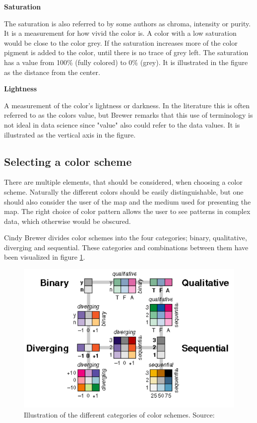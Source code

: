 \textbf{Saturation}

The saturation is also referred to by some authors as chroma, intensity or purity. It is a measurement for how vivid the color is. A color with a low saturation would be close to the color grey. If the saturation increases more of the color pigment is added to the color, until there is no trace of grey left. The saturation has a value from 100\% (fully colored) to 0\% (grey). It is illustrated in the figure as the distance from the center.

\textbf{Lightness}

A measurement of the color’s lightness or darkness. In the literature this is often referred to as the colors value, but Brewer remarks that this use of terminology is not ideal in data science since "value" also could refer to the data values. It is illustrated as the vertical axis in the figure.  \citep{Dent}

 
\subsection{Selecting a color scheme}
There are multiple elements, that should be considered, when choosing a color scheme.
Naturally the different colors should be easily distinguishable, but one should also consider the user of the map and the medium used for presenting the map. The right choice of color pattern allows the user to see patterns in complex data, which otherwise would be obscured. 


Cindy Brewer divides color schemes into the four categories; binary, qualitative, diverging and sequential. These categories and combinations between them have been visualized in figure \ref{BrewerDataTypes}. \citep{Brewer94}

\begin{figure} [H]
	\centering
	\includegraphics[width=.8\textwidth]{Pictures/BrewerDataTypes}
	\caption{Illustration of the different categories of color schemes. Source: \citet{ColorGuidelines}}
	\label{BrewerDataTypes}
\end{figure}
 

